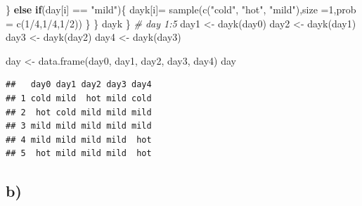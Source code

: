 \documentclass[
]{article}
\newenvironment{Shaded}{\begin{snugshade}}{\end{snugshade}}
\newcommand{\AttributeTok}[1]{\textcolor[rgb]{0.77,0.63,0.00}{#1}}
\newcommand{\CommentTok}[1]{\textcolor[rgb]{0.56,0.35,0.01}{\textit{#1}}}
\newcommand{\ControlFlowTok}[1]{\textcolor[rgb]{0.13,0.29,0.53}{\textbf{#1}}}
\newcommand{\DecValTok}[1]{\textcolor[rgb]{0.00,0.00,0.81}{#1}}
\newcommand{\FunctionTok}[1]{\textcolor[rgb]{0.00,0.00,0.00}{#1}}
\newcommand{\NormalTok}[1]{#1}
\newcommand{\OtherTok}[1]{\textcolor[rgb]{0.56,0.35,0.01}{#1}}
\newcommand{\SpecialCharTok}[1]{\textcolor[rgb]{0.00,0.00,0.00}{#1}}
\newcommand{\StringTok}[1]{\textcolor[rgb]{0.31,0.60,0.02}{#1}}
\begin{document}
\begin{Shaded}
\begin{Highlighting}[]
\NormalTok{    \}}
    \ControlFlowTok{else} \ControlFlowTok{if}\NormalTok{(day[i] }\SpecialCharTok{==} \StringTok{"mild"}\NormalTok{)\{}
\NormalTok{      dayk[i]}\OtherTok{=} \FunctionTok{sample}\NormalTok{(}\FunctionTok{c}\NormalTok{(}\StringTok{"cold"}\NormalTok{, }\StringTok{"hot"}\NormalTok{, }\StringTok{"mild"}\NormalTok{),}\AttributeTok{size =}\DecValTok{1}\NormalTok{,}\AttributeTok{prob =} \FunctionTok{c}\NormalTok{(}\DecValTok{1}\SpecialCharTok{/}\DecValTok{4}\NormalTok{,}\DecValTok{1}\SpecialCharTok{/}\DecValTok{4}\NormalTok{,}\DecValTok{1}\SpecialCharTok{/}\DecValTok{2}\NormalTok{))}
\NormalTok{    \}}
\NormalTok{  \}}
\NormalTok{  dayk}
\NormalTok{\}}
\CommentTok{\# day 1:5}
\NormalTok{day1 }\OtherTok{\textless{}{-}} \FunctionTok{dayk}\NormalTok{(day0)}
\NormalTok{day2 }\OtherTok{\textless{}{-}} \FunctionTok{dayk}\NormalTok{(day1)}
\NormalTok{day3 }\OtherTok{\textless{}{-}} \FunctionTok{dayk}\NormalTok{(day2)}
\NormalTok{day4 }\OtherTok{\textless{}{-}} \FunctionTok{dayk}\NormalTok{(day3)}

\NormalTok{day }\OtherTok{\textless{}{-}} \FunctionTok{data.frame}\NormalTok{(day0, day1, day2, day3, day4)}
\NormalTok{day}
\end{Highlighting}
\end{Shaded}

\begin{verbatim}
##   day0 day1 day2 day3 day4
## 1 cold mild  hot mild cold
## 2  hot cold mild mild mild
## 3 mild mild mild mild mild
## 4 mild mild mild mild  hot
## 5  hot mild mild mild  hot
\end{verbatim}

\hypertarget{b}{%
\subsection{b)}\label{b}}
\end{document}
